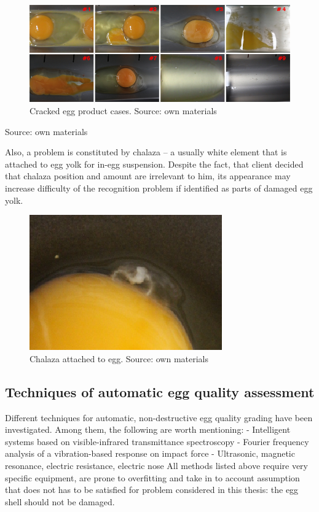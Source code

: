 \documentclass[12pt,twoside,a4paper]{article}
\begin{document}
 

\begin{figure}[H]
\centering
\includegraphics[width=0.8\paperwidth]{8of9}
\caption{Cracked egg product cases. Source: own materials }
\end{figure}
Source: own materials 

Also, a problem is constituted by chalaza – a usually white element that is attached to egg yolk for in-egg suspension.
Despite the fact, that client decided that chalaza position and amount are irrelevant to him, its appearance may increase difficulty of the recognition problem if identified as parts of damaged egg yolk.

 
\begin{figure}[H]
\centering
\includegraphics[width=0.4\paperwidth]{chalaza}
\caption{Chalaza attached to egg. Source: own materials}
\end{figure}


\subsection{Techniques of automatic egg quality assessment}

Different techniques for automatic, non-destructive egg quality grading have been investigated.
Among them, the following are worth mentioning:
- Intelligent systems based on visible-infrared transmittance spectroscopy\cite{agri}
- Fourier frequency analysis of a vibration-based response on impact force\cite{svm} 
- Ultrasonic, magnetic resonance, electric resistance, electric nose\cite{nondestr}  
All methods listed above require very specific equipment, are prone to overfitting and take in to account assumption that does not has to be satisfied for problem considered in this thesis: the egg shell should not be damaged.
\end{document}
